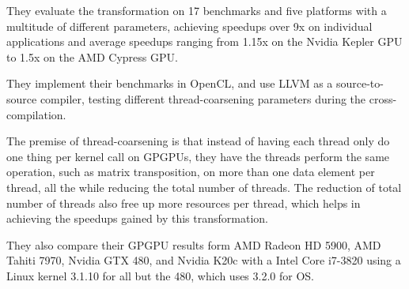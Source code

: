 They evaluate the transformation on 17 benchmarks and five platforms with a multitude of different parameters, achieving speedups over 9x on individual applications and average speedups ranging from 1.15x on the Nvidia Kepler GPU to 1.5x on the AMD Cypress GPU.

They implement their benchmarks in OpenCL, and use LLVM as a source-to-source compiler, testing different thread-coarsening parameters during the cross-compilation.

The premise of thread-coarsening is that instead of having each thread only do one thing per kernel call on GPGPUs, they have the threads perform the same operation, such as matrix transposition, on more than one data element per thread, all the while reducing the total number of threads.
The reduction of total number of threads also free up more resources per thread, which helps in achieving the speedups gained by this transformation.

They also compare their GPGPU results form AMD Radeon HD 5900, AMD Tahiti 7970, Nvidia GTX 480, and Nvidia K20c with a Intel Core i7-3820 using a Linux kernel 3.1.10 for all but the 480, which uses 3.2.0 for OS.


